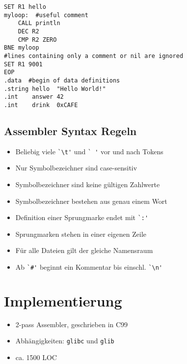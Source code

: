 \begin{frame}[fragile]{\insertsubsection}
\begin{verbatim}
SET R1 hello
myloop:  #useful comment
    CALL println
    DEC R2
    CMP R2 ZERO
BNE myloop
#lines containing only a comment or nil are ignored
SET R1 9001
EOP
.data  #begin of data definitions
.string hello  "Hello World!"
.int    answer 42
.int    drink  0xCAFE
\end{verbatim}
\end{frame}

\subsection{Assembler Syntax Regeln}

\begin{frame}[fragile]{\insertsubsection}
    \begin{itemize}
        \item Beliebig viele \verb#`\t'# und \verb*#` '# vor und nach Tokens
        \item Nur Symbolbezeichner sind case-sensitiv
        \item Symbolbezeichner sind keine gültigen Zahlwerte
        \item Symbolbezeichner bestehen aus genau einem Wort
    \end{itemize}
\end{frame}

\begin{frame}[fragile]{\insertsubsection}
    \begin{itemize}
        \item Definition einer Sprungmarke endet mit \verb#`:'#
        \item Sprungmarken stehen in einer eigenen Zeile
        \item Für alle Dateien gilt der gleiche Namensraum
        \item Ab \verb|`#'| beginnt ein Kommentar bis einschl. \verb#`\n'#
    \end{itemize}
\end{frame}

\section{Implementierung}

\begin{frame}[fragile]{\insertsection}
    \begin{itemize}
        \item 2-pass Assembler, geschrieben in C99
        \item Abhängigkeiten: \texttt{glibc} und \texttt{glib}
        \item ca. 1500 LOC
    \end{itemize}
\end{frame}

